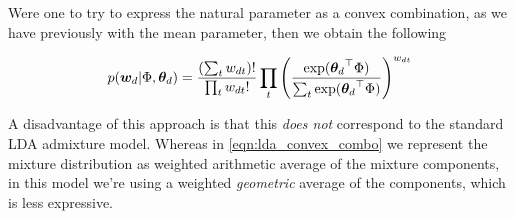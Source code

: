 Were one to try to express the natural parameter as a convex combination, as we have previously with the mean parameter, then we obtain the following

\begin{align}
p({ \bm w_d }|\Phi, { \bm \theta_d }) = \frac{(\sum_t w_{dt})!}{\prod_t w_{dt} !} 
\prod_t \left(   
    \frac{\exp({ \bm \theta_d }^\top\Phi)}{\sum_t \exp({ \bm \theta_d }^\top\Phi)}
\right)^{w_{dt}}
\end{align}

A disadvantage of this approach is that this \emph{does not} correspond to the standard LDA admixture model. Whereas in \eqref{eqn:lda_convex_combo} we represent the mixture distribution as weighted arithmetic average of the mixture components, in this model we're using a weighted \emph{geometric} average of the components, which is less expressive.



